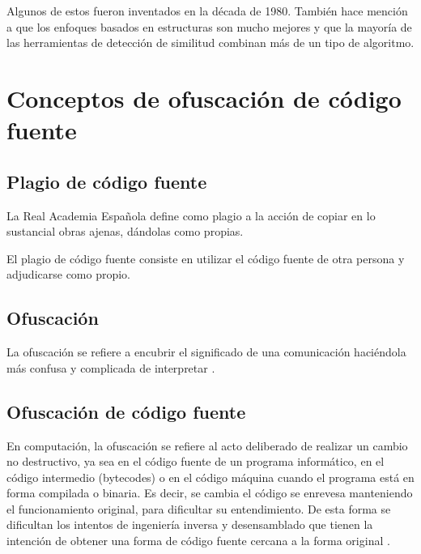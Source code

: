 Algunos de estos fueron inventados en la década de 1980. También hace mención a que los enfoques basados en estructuras son mucho mejores y que la mayoría de las herramientas de detección de similitud combinan más de un tipo de algoritmo.

\section{Conceptos de ofuscación de código fuente}
\subsection{Plagio de código fuente}
\cite{wiki:Plagiarism} La Real Academia Española define como plagio a la acción de copiar en lo sustancial obras ajenas, dándolas como propias.

El plagio de código fuente consiste en utilizar el código fuente de otra persona y adjudicarse como propio.

\subsection{Ofuscación}
La ofuscación se refiere a encubrir el significado de una comunicación haciéndola más confusa y complicada de interpretar \cite{wiki:Obfuscation_(software)}.

\subsection{Ofuscación de código fuente}
En computación, la ofuscación se refiere al acto deliberado de realizar un cambio no destructivo, ya sea en el código fuente de un programa informático, en el código intermedio (bytecodes) o en el código máquina cuando el programa está en forma compilada o binaria. Es decir, se cambia el código se enrevesa manteniendo el funcionamiento original, para dificultar su entendimiento. De esta forma se dificultan los intentos de ingeniería inversa y desensamblado que tienen la intención de obtener una forma de código fuente cercana a la forma original \cite{wiki:Obfuscation_(software)}.

